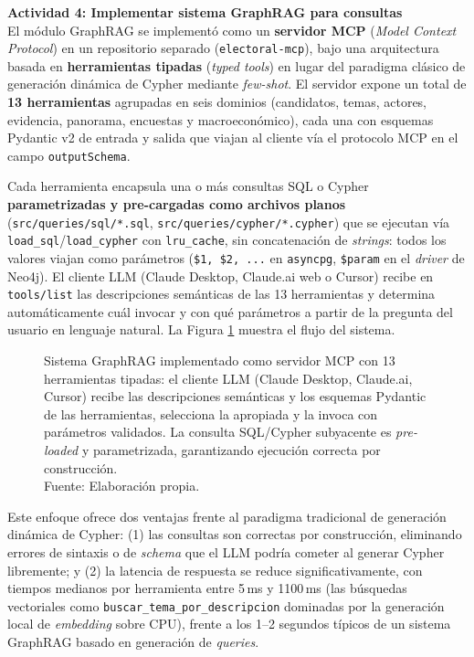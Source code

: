 \textbf{Actividad 4: Implementar sistema GraphRAG para consultas}
\\
El módulo GraphRAG se implementó como un \textbf{servidor MCP}
(\textit{Model Context Protocol}) en un repositorio separado
(\texttt{electoral-mcp}), bajo una arquitectura basada en \textbf{herramientas
tipadas} (\textit{typed tools}) en lugar del paradigma clásico de generación
dinámica de Cypher mediante \textit{few-shot}. El servidor expone un total de
\textbf{13 herramientas} agrupadas en seis dominios (candidatos, temas, actores,
evidencia, panorama, encuestas y macroeconómico), cada una con esquemas Pydantic
v2 de entrada y salida que viajan al cliente vía el protocolo MCP en el campo
\texttt{outputSchema}.

Cada herramienta encapsula una o más consultas SQL o Cypher \textbf{parametrizadas
y pre-cargadas como archivos planos}
(\texttt{src/queries/sql/*.sql}, \texttt{src/queries/cypher/*.cypher}) que se
ejecutan vía \texttt{load\_sql}/\texttt{load\_cypher} con \texttt{lru\_cache}, sin
concatenación de \textit{strings}: todos los valores viajan como parámetros
(\texttt{\$1, \$2, ...} en \texttt{asyncpg}, \texttt{\$param} en el \textit{driver}
de Neo4j). El cliente LLM (Claude Desktop, Claude.ai web o Cursor) recibe en
\texttt{tools/list} las descripciones semánticas de las 13 herramientas y
determina automáticamente cuál invocar y con qué parámetros a partir de la
pregunta del usuario en lenguaje natural. La Figura \ref{5:fig22} muestra el
flujo del sistema.

\begin{figure}[!ht]
    \begin{center}
        \resizebox{0.85\textwidth}{!}{}
        \caption[Sistema GraphRAG basado en herramientas tipadas sobre protocolo MCP]{Sistema GraphRAG implementado como servidor MCP con 13 herramientas tipadas: el cliente LLM (Claude Desktop, Claude.ai, Cursor) recibe las descripciones semánticas y los esquemas Pydantic de las herramientas, selecciona la apropiada y la invoca con parámetros validados. La consulta SQL/Cypher subyacente es \textit{pre-loaded} y parametrizada, garantizando ejecución correcta por construcción.\\
            Fuente: Elaboración propia.}
        \label{5:fig22}
    \end{center}
\end{figure}

Este enfoque ofrece dos ventajas frente al paradigma tradicional de generación
dinámica de Cypher: (1) las consultas son correctas por construcción, eliminando
errores de sintaxis o de \textit{schema} que el LLM podría cometer al generar
Cypher libremente; y (2) la latencia de respuesta se reduce significativamente,
con tiempos medianos por herramienta entre 5\,ms y 1100\,ms (las búsquedas
vectoriales como \texttt{buscar\_tema\_por\_descripcion} dominadas por la
generación local de \textit{embedding} sobre CPU), frente a los 1--2 segundos
típicos de un sistema GraphRAG basado en generación de \textit{queries}.

